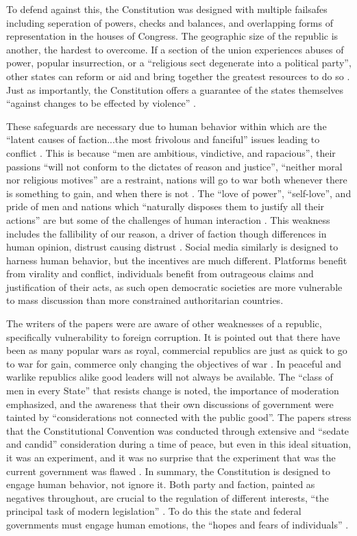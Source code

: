 To defend against this, the Constitution was designed with multiple failsafes including seperation of powers, checks and balances, and overlapping forms of representation in the houses of Congress.
The geographic size of the republic is another, the hardest to overcome.
If a section of the union experiences abuses of power, popular insurrection, or a ``religious sect degenerate into a political party'', other states can reform or aid and bring together the greatest resources to do so \cite[n. 10]{fed}.
Just as importantly, the Constitution offers a guarantee of the states themselves ``against changes to be effected by violence'' \cite[n. 21]{fed}.

These safeguards are necessary due to human behavior within which are the ``latent causes of faction...the most frivolous and fanciful'' issues leading to conflict \cite[n. 10]{fed}.
This is because ``men are ambitious, vindictive, and rapacious'', their passions ``will not conform to the dictates of reason and justice'', ``neither moral nor religious motives'' are a restraint, nations will go to war both whenever there is something to gain, and when there is not \cite[n. 6, 15, 4]{fed}.
The ``love of power'', ``self-love'', and pride of men and nations which ``naturally disposes them to justify all their actions'' are but some of the challenges of human interaction \cite[n. 10, 3]{fed}.
This weakness includes the fallibility of our reason, a driver of faction though differences in human opinion, distrust causing distrust \cite[n. 10]{fed}.
Social media similarly is designed to harness human behavior, but the incentives are much different.
Platforms benefit from virality and conflict, individuals benefit from  outrageous claims and justification of their acts, as such open democratic societies are more vulnerable to mass discussion than more constrained authoritarian countries.

The writers of the papers were are aware of other weaknesses of a republic, specifically vulnerability to foreign corruption.
It is pointed out that there have been as many popular wars as royal, commercial republics are just as quick to go to war for gain, commerce only changing the objectives of war \cite[n. 6]{fed}.
In peaceful and warlike republics alike good leaders will not always be available.
The ``class of men in every State'' that resists change is noted, the importance of moderation emphasized, and the awareness that their own discussions of government were tainted by ``considerations not connected with the public good''.
The papers stress that the Constitutional Convention was conducted through extensive and ``sedate and candid'' consideration during a time of peace, but even in this ideal situation, it was an experiment, and it was no surprise that the experiment that was the current government was flawed \cite[n. 1]{fed}.
In summary, the Constitution is designed to engage human behavior, not ignore it. 
Both party and faction, painted as negatives throughout, are crucial to the regulation of different interests, ``the principal task of modern legislation'' \cite[n. 10]{fed}.
To do this the state and federal governments must engage human emotions, the ``hopes and fears of individuals'' \cite[n. 16]{fed}.


